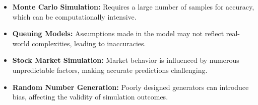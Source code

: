 \begin{mdframed}[style=detailsstyle, title=Challenges and Limitations]
    \begin{itemize}
        \item \textbf{Monte Carlo Simulation:} Requires a large number of samples for accuracy, which can be computationally intensive.
        \item \textbf{Queuing Models:} Assumptions made in the model may not reflect real-world complexities, leading to inaccuracies.
        \item \textbf{Stock Market Simulation:} Market behavior is influenced by numerous unpredictable factors, making accurate predictions challenging.
        \item \textbf{Random Number Generation:} Poorly designed generators can introduce bias, affecting the validity of simulation outcomes.
    \end{itemize}
\end{mdframed}
